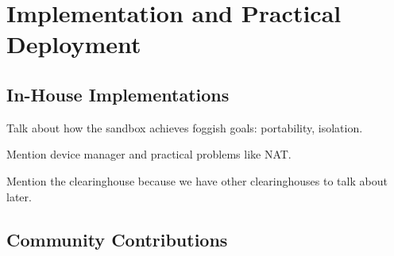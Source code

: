 \section{Implementation and Practical Deployment}

\subsection{In-House Implementations}

Talk about how the sandbox achieves foggish goals: portability, isolation.

Mention device manager and practical problems like NAT.

Mention the clearinghouse because we have other clearinghouses
to talk about later.

\subsection{Community Contributions}

